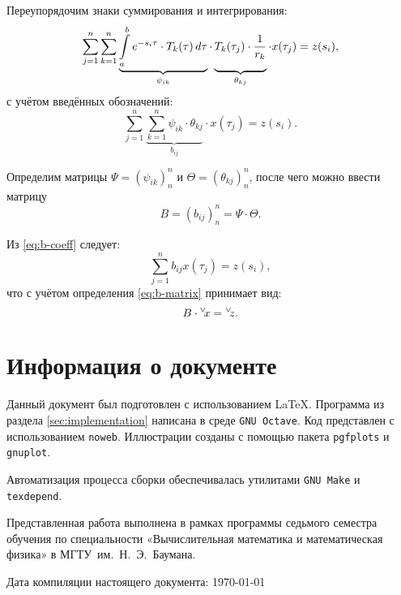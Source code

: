 \documentclass[11pt]{article}
\numberwithin{equation}{section}
\newcommand{\intl}{\int\limits}
\renewcommand{\vec}[1]{{}^{\vee}\negmedspace#1}
\newcommand{\program}[1]{{\tt #1}}
\newcommand{\name}{\textsc}
\newcommand{\mul}{\cdot}
\begin{document}
Переупорядочим знаки суммирования и интегрирования:
\begin{equation}
  \label{eq:psi-theta}
  \sum_{j=1}^n
    \sum_{k=1}^n \underbrace{
      \intl_a^b e^{-s_i\tau}\mul T_k(\tau)\,d\tau}_{\psi_{ik}}
    \mul \underbrace{\vphantom{\intl_a^b} T_k(\tau_j) \mul \frac{1}{r_k}}_{\theta_{kj}}
  \mul x(\tau_j) = z(s_i),
\end{equation}
с учётом введённых обозначений:
\begin{equation}
  \label{eq:b-coeff}
  \sum_{j=1}^n{ 
    \underbrace{\sum_{k=1}^n \psi_{ik} \mul \theta_{kj}}_{b_{ij}} \mul
    x(\tau_j)} = z(s_i).
\end{equation}

Определим матрицы $\Psi = (\psi_{ik})_n^n$ и $\Theta =
(\theta_{kj})_n^n$, после чего можно ввести матрицу 
\begin{equation}
  \label{eq:b-matrix}
  B = (b_{ij})_n^n = \Psi\mul\Theta.
\end{equation}

Из \eqref{eq:b-coeff} следует:
\begin{equation*}
  \sum_{j=1}^nb_{ij}x(\tau_j) = z(s_i),
\end{equation*}
что с учётом определения \eqref{eq:b-matrix} принимает вид:
\begin{equation}
  \label{eq:discrete}
  B\mul\vec{x}=\vec{z}.
\end{equation}

\clearpage
\section{Информация о документе}

Данный документ был подготовлен с использованием \LaTeX{}. Программа
из раздела \ref{sec:implementation} написана в среде
\program{GNU Octave}. Код представлен с использованием
\program{noweb}. Иллюстрации созданы с помощью пакета
\program{pgfplots} и \program{gnuplot}.

Автоматизация процесса сборки обеспечивалась утилитами
\program{GNU Make} и \program{texdepend}.

Представленная работа выполнена в рамках программы седьмого семестра
обучения по специальности «Вычислительная математика и математическая
физика» в МГТУ им. Н. Э. Баумана.

Дата компиляции настоящего документа: \today
\newcommand{\BibEmph}{\name}


\end{document}
